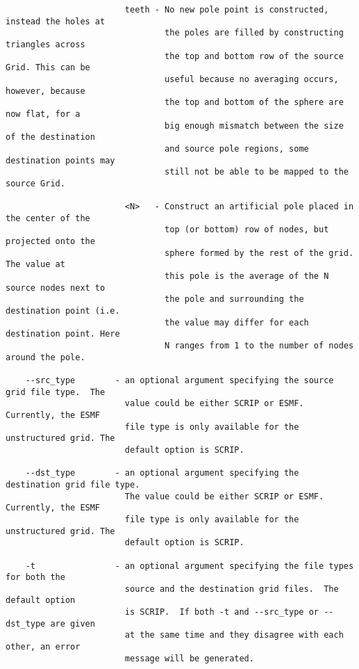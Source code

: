 \begin{verbatim}
                        teeth - No new pole point is constructed, instead the holes at 
                                the poles are filled by constructing triangles across 
                                the top and bottom row of the source Grid. This can be
                                useful because no averaging occurs, however, because 
                                the top and bottom of the sphere are now flat, for a
                                big enough mismatch between the size of the destination
                                and source pole regions, some destination points may
                                still not be able to be mapped to the source Grid. 

                        <N>   - Construct an artificial pole placed in the center of the 
                                top (or bottom) row of nodes, but projected onto the
                                sphere formed by the rest of the grid. The value at
                                this pole is the average of the N source nodes next to
                                the pole and surrounding the destination point (i.e.
                                the value may differ for each destination point. Here 
                                N ranges from 1 to the number of nodes around the pole. 

    --src_type        - an optional argument specifying the source grid file type.  The 
                        value could be either SCRIP or ESMF.  Currently, the ESMF 
                        file type is only available for the unstructured grid. The 
                        default option is SCRIP.

    --dst_type        - an optional argument specifying the destination grid file type.  
                        The value could be either SCRIP or ESMF.  Currently, the ESMF 
                        file type is only available for the unstructured grid. The 
                        default option is SCRIP.

    -t                - an optional argument specifying the file types for both the 
                        source and the destination grid files.  The default option 
                        is SCRIP.  If both -t and --src_type or --dst_type are given
                        at the same time and they disagree with each other, an error
                        message will be generated.
\end{verbatim}

